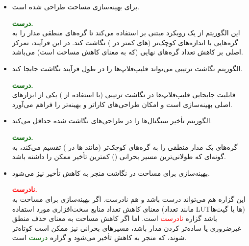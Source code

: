 \begin{itemize}
	
	
	
	\item {} برای بهینه‌سازی مساحت طراحی شده است.
	\begin{qsolve}
		\textbf{\textcolor{darkgreen}{درست.}}\\
		این الگوریتم از یک رویکرد مبتنی بر   استفاده می‌کند تا گره‌های منطقی مدار را به گره‌هایی با اندازه‌های کوچک‌تر (های کمتر در ) نگاشت کند. در این فرآیند، تمرکز اصلی بر کاهش تعداد گره‌های نهایی (که به معنای کاهش مساحت است) می‌باشد.
	\end{qsolve}
	
	
	
	
	\item الگوریتم نگاشت ترتیبی می‌تواند فلیپ‌فلاپ‌ها را در طول فرآیند نگاشت جابجا کند.
	\begin{qsolve}
		\textbf{\textcolor{darkgreen}{درست.}}\\
		قابلیت جابجایی فلیپ‌فلاپ‌ها در نگاشت ترتیبی (با استفاده از ) یکی از ابزارهای اصلی بهینه‌سازی است و امکان طراحی‌های کاراتر و بهینه‌تر را فراهم می‌آورد.
		
	\end{qsolve}
	
	
	
	
	\item الگوریتم  تأخیر سیگنال‌ها را در طراحی‌های نگاشت شده حداقل می‌کند.
	\begin{qsolve}
		\textbf{\textcolor{darkgreen}{درست.}}\\
		 گره‌های یک مدار منطقی را به گره‌های کوچک‌تر (مانند ها در ) تقسیم می‌کند، به گونه‌ای که طولانی‌ترین مسیر بحرانی () کمترین تأخیر ممکن را داشته باشد.
	\end{qsolve}
	
	
	
	\item بهینه‌سازی برای مساحت در نگاشت منجر به کاهش تأخیر نیز می‌شود.
	\begin{qsolve}
		\textbf{\textcolor{red}{نادرست.}}\\
		این گزاره هم می‌تواند درست باشد و هم نادرست. اگر بهینه‌سازی برای مساحت به معنای کاهش تعداد منابع سخت‌افزاری مورد استفاده (مانند تعداد LUTها یا گیت‌ها) باشد گزاره \textcolor{red}{نادرست} است. اما اگر کاهش مساحت به معنای حذف منطق غیرضروری یا ساده‌تر کردن مدار باشد، مسیرهای بحرانی نیز ممکن است کوتاه‌تر شوند، که منجر به کاهش تأخیر می‌شود و گزاره \textcolor{darkgreen}{درست} است.
	\end{qsolve}
	

\end{itemize}
